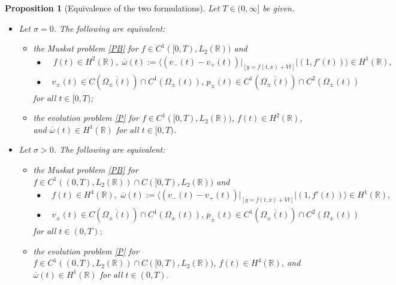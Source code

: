 \documentclass[11pt,reqno]{amsart}
\numberwithin{equation}{section}
\newcommand{\0}{\Omega}
\newcommand{\ov}{\overline}
\newcommand{\R}{\mathbb{R}}
\newtheorem{prop}[thm]{Proposition}
\numberwithin{equation}{section}
\begin{document}
\begin{prop}[Equivalence of the two formulations]\label{PE}
Let   $T\in(0,\infty] $ be given.
\begin{itemize}
 \item[$(a)$] Let $\sigma=0$. 
The following are equivalent:\\[-1.5ex]
 \begin{itemize}
 \item[$(i)$] the Muskat problem \eqref{PB} for $ f\in   C^1([0,T), L_2(\R))$ and
 \begin{align*}
  \bullet &\, \, \, \, f(t)\in  H^2(\R),\, \, \ov\omega(t):=\big\langle (v_-(t)-v_+(t))|_{[y=f(t,x)+Vt]} \big|(1,f'(t))\big\rangle \in  H^1(\R),\\[1ex]
  \bullet &\, \, \, v_\pm(t)\in C(\ov{\0_\pm(t)})\cap C^1({\0_\pm(t)}), \, p_\pm(t)\in C^1(\ov{\0_\pm(t)})\cap C^2({\0_{\pm}(t)}) 
 \end{align*}
 for all $t\in[0,T)$;\\[-2ex]
\item[$(ii)$] the evolution  problem \eqref{P} for $f\in   C^1([0,T), L_2(\R))$, $f(t)\in  H^2(\R)$, and $  \ov\omega(t)\in  H^1(\R)$ for all $t\in[0,T)$.\\[-1.5ex]
\end{itemize}
\item[$(b)$] Let $\sigma>0$. 
The following are equivalent:\\[-1.5ex]
 \begin{itemize}
 \item[$(i)$] the Muskat problem \eqref{PB} for $f\in   C^1((0,T), L_2(\R))\cap C([0,T), L_2(\R))$ and
 \begin{align*}
  \bullet &\, \, \,  f(t)\in  H^4(\R),   \,\,\ov\omega(t):=\big\langle (v_-(t)-v_+(t))|_{[y=f(t,x)+Vt]} \big|(1,f'(t))\big\rangle \in  H^1(\R),  \\[1ex]
  \bullet &\, \, \, v_\pm(t)\in C(\ov{\0_\pm(t)})\cap C^1({\0_\pm(t)}), \, p_\pm(t)\in C^1(\ov{\0_\pm(t)})\cap C^2({\0_{\pm}(t)}) 
 \end{align*}
 for all $t\in(0,T);$\\[-2ex]
\item[$(ii)$] the evolution problem \eqref{P} for $f\in   C^1((0,T), L_2(\R))\cap C([0,T), L_2(\R))$, $ f(t)\in  H^4(\R)$, and $ \ov\omega(t)\in  H^1(\R) $ for all $t\in(0,T)$.
\end{itemize}
\end{itemize}
\end{prop}
\end{document}
